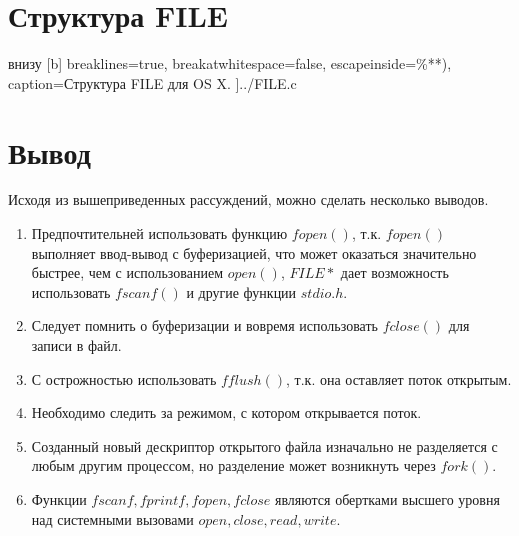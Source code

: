 \section{Структура FILE}

		 внизу [b] 
		breaklines=true,           %
		breakatwhitespace=false, %
		escapeinside={\%*}{*)},  %
		caption=Структура FILE для OS X.
		]{../FILE.c}

\section{Вывод}

Исходя из вышеприведенных рассуждений, можно сделать несколько выводов.

\begin{enumerate}
	\item  Предпочтительней использовать функцию $fopen()$, т.к. $fopen()$ выполняет ввод-вывод с буферизацией, что может оказаться значительно быстрее, чем  с использованием $open()$, $FILE *$ дает возможность использовать $fscanf()$ и другие функции $stdio.h$.
	\item Следует помнить о буферизации и вовремя использовать $fclose()$ для записи в файл.
	\item С острожностью использовать $fflush()$, т.к. она оставляет поток открытым.
	\item Необходимо следить за режимом, с котором открывается поток. 
	\item Созданный новый дескриптор открытого файла  изначально не разделяется с любым другим процессом, но разделение может возникнуть через $fork()$.
	\item Функции $fscanf, fprintf, fopen, fclose$ являются обертками высшего уровня над системными вызовами $open, close, read, write$.
\end{enumerate}